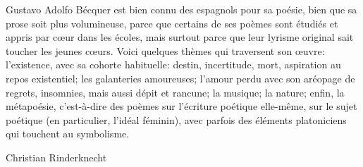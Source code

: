 Gustavo Adolfo Bécquer est bien connu des espagnols pour sa poésie,
bien que sa prose soit plus volumineuse, parce que certains de ses
poèmes sont étudiés et appris par cœur dans les écoles, mais surtout
parce que leur lyrisme original sait toucher les jeunes cœurs. Voici
quelques thèmes qui traversent son œuvre: l'existence, avec sa cohorte
habituelle: destin, incertitude, mort, aspiration au repos
existentiel; les galanteries amoureuses; l'amour perdu avec son
aréopage de regrets, insomnies, mais aussi dépit et rancune; la
musique; la nature; enfin, la métapoésie, c'est-à-dire des poèmes sur
l'écriture poétique elle-même, sur le sujet poétique (en particulier,
l'idéal féminin), avec parfois des éléments platoniciens qui touchent
au symbolisme.

\bigskip
\bigskip
\bigskip
\bigskip
\hfill Christian Rinderknecht
